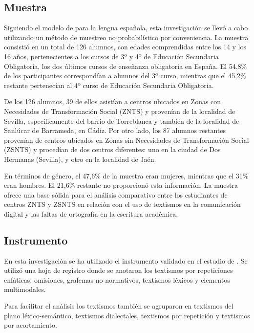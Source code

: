 \documentclass[spanish]{textolivre}
\begin{document}
\subsection{Muestra}

Siguiendo el modelo de \textcite{gomez-camacho_youth_2023b} para la lengua española, esta investigación se llevó a cabo utilizando un método de muestreo no probabilístico por conveniencia. La muestra consistió en un total de 126 alumnos, con edades comprendidas entre los 14 y los 16 años, pertenecientes a los cursos de 3º y 4º de Educación Secundaria Obligatoria, los dos últimos cursos de enseñanza obligatoria en España. El 54,8\% de los participantes correspondían a alumnos del 3º curso, mientras que el 45,2\% restante pertenecían al 4º curso de Educación Secundaria Obligatoria.

De los 126 alumnos, 39 de ellos asistían a centros ubicados en Zonas con Necesidades de Transformación Social (ZNTS) y provenían de la localidad de Sevilla, específicamente del barrio de Torreblanca y también de la localidad de Sanlúcar de Barrameda, en Cádiz. Por otro lado, los 87 alumnos restantes provenían de centros ubicados en Zonas sin Necesidades de Transformación Social (ZSNTS) y procedían de dos centros diferentes: uno en la ciudad de Dos Hermanas (Sevilla), y otro en la localidad de Jaén.

En términos de género, el 47,6\% de la muestra eran mujeres, mientras que el 31\% eran hombres. El 21,6\% restante no proporcionó esta información. La muestra ofrece una base sólida para el análisis comparativo entre los estudiantes de centros ZNTS y ZSNTS en relación con el uso de textismos en la comunicación digital y las faltas de ortografía en la escritura académica.



\subsection{Instrumento}

En esta investigación se ha utilizado el instrumento validado en el estudio de \textcite{gomez-camacho_youth_2023b}. Se utilizó una hoja de registro donde se anotaron los textismos por repeticiones enfáticas, omisiones, grafemas no normativos, textismos léxicos y elementos multimodales.

Para facilitar el análisis los textismos también se agruparon en textismos del plano léxico-semántico, textismos dialectales, textismos por repetición y textismos por acortamiento. 
\end{document}
